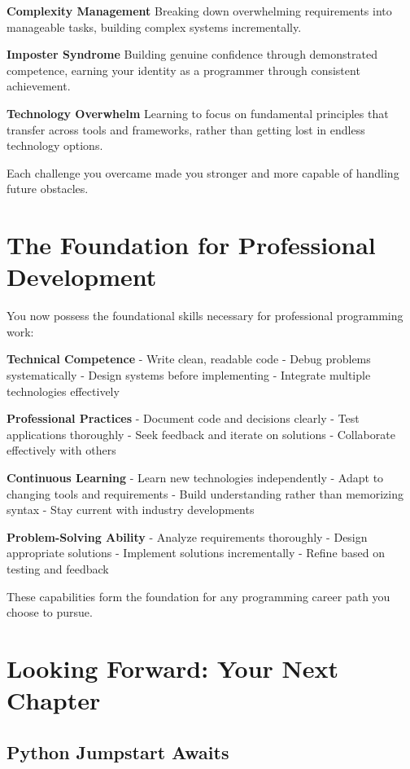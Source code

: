 \documentclass[
  letterpaper,
  DIV=11,
  numbers=noendperiod,
  oneside]{scrreprt}
\begin{document}
\textbf{Complexity Management} Breaking down overwhelming requirements
into manageable tasks, building complex systems incrementally.

\textbf{Imposter Syndrome} Building genuine confidence through
demonstrated competence, earning your identity as a programmer through
consistent achievement.

\textbf{Technology Overwhelm} Learning to focus on fundamental
principles that transfer across tools and frameworks, rather than
getting lost in endless technology options.

Each challenge you overcame made you stronger and more capable of
handling future obstacles.

\section{The Foundation for Professional
Development}\label{the-foundation-for-professional-development}

You now possess the foundational skills necessary for professional
programming work:

\textbf{Technical Competence} - Write clean, readable code - Debug
problems systematically - Design systems before implementing - Integrate
multiple technologies effectively

\textbf{Professional Practices} - Document code and decisions clearly -
Test applications thoroughly - Seek feedback and iterate on solutions -
Collaborate effectively with others

\textbf{Continuous Learning} - Learn new technologies independently -
Adapt to changing tools and requirements - Build understanding rather
than memorizing syntax - Stay current with industry developments

\textbf{Problem-Solving Ability} - Analyze requirements thoroughly -
Design appropriate solutions - Implement solutions incrementally -
Refine based on testing and feedback

These capabilities form the foundation for any programming career path
you choose to pursue.

\section{Looking Forward: Your Next
Chapter}\label{looking-forward-your-next-chapter}

\subsection{Python Jumpstart Awaits}\label{python-jumpstart-awaits}
\end{document}
